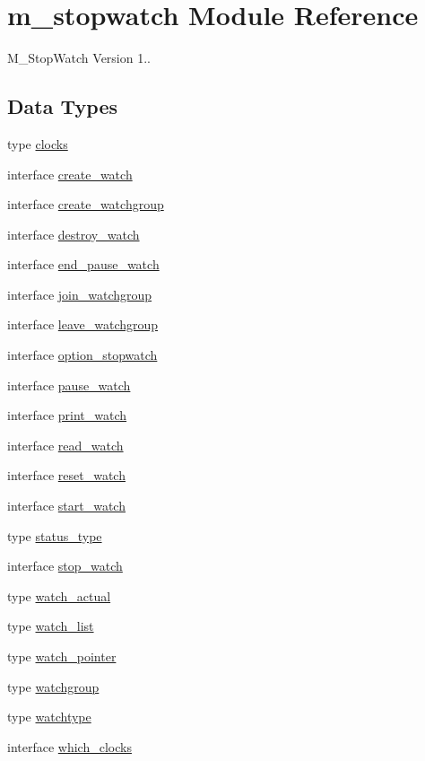 \hypertarget{namespacem__stopwatch}{}\section{m\+\_\+stopwatch Module Reference}
\label{namespacem__stopwatch}


M\+\_\+\+Stop\+Watch Version 1..  


\subsection*{Data Types}
\begin{DoxyCompactItemize}
\item 
type \hyperlink{structm__stopwatch_1_1clocks}{clocks}
\item 
interface \hyperlink{interfacem__stopwatch_1_1create__watch}{create\+\_\+watch}
\item 
interface \hyperlink{interfacem__stopwatch_1_1create__watchgroup}{create\+\_\+watchgroup}
\item 
interface \hyperlink{interfacem__stopwatch_1_1destroy__watch}{destroy\+\_\+watch}
\item 
interface \hyperlink{interfacem__stopwatch_1_1end__pause__watch}{end\+\_\+pause\+\_\+watch}
\item 
interface \hyperlink{interfacem__stopwatch_1_1join__watchgroup}{join\+\_\+watchgroup}
\item 
interface \hyperlink{interfacem__stopwatch_1_1leave__watchgroup}{leave\+\_\+watchgroup}
\item 
interface \hyperlink{interfacem__stopwatch_1_1option__stopwatch}{option\+\_\+stopwatch}
\item 
interface \hyperlink{interfacem__stopwatch_1_1pause__watch}{pause\+\_\+watch}
\item 
interface \hyperlink{interfacem__stopwatch_1_1print__watch}{print\+\_\+watch}
\item 
interface \hyperlink{interfacem__stopwatch_1_1read__watch}{read\+\_\+watch}
\item 
interface \hyperlink{interfacem__stopwatch_1_1reset__watch}{reset\+\_\+watch}
\item 
interface \hyperlink{interfacem__stopwatch_1_1start__watch}{start\+\_\+watch}
\item 
type \hyperlink{structm__stopwatch_1_1status__type}{status\+\_\+type}
\item 
interface \hyperlink{interfacem__stopwatch_1_1stop__watch}{stop\+\_\+watch}
\item 
type \hyperlink{structm__stopwatch_1_1watch__actual}{watch\+\_\+actual}
\item 
type \hyperlink{structm__stopwatch_1_1watch__list}{watch\+\_\+list}
\item 
type \hyperlink{structm__stopwatch_1_1watch__pointer}{watch\+\_\+pointer}
\item 
type \hyperlink{structm__stopwatch_1_1watchgroup}{watchgroup}
\item 
type \hyperlink{structm__stopwatch_1_1watchtype}{watchtype}
\item 
interface \hyperlink{interfacem__stopwatch_1_1which__clocks}{which\+\_\+clocks}
\end{DoxyCompactItemize}
